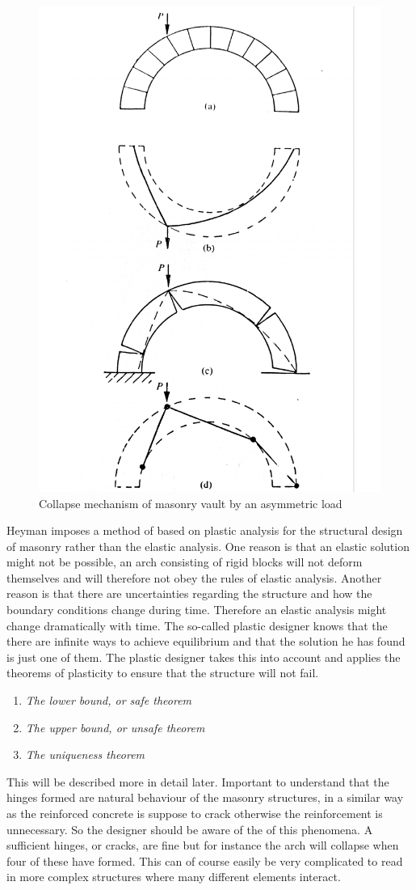 \begin{figure}[H] 
\centering
\includegraphics[width=0.5\linewidth ]{figure/Theory/heyman3.pdf}
\caption{Collapse mechanism of masonry vault by an asymmetric load}
\label{fig:arch2}
\end{figure}

Heyman imposes a method of based on plastic analysis for the structural design of masonry rather than the elastic analysis. One reason is that an elastic solution might not be possible, an arch consisting of rigid blocks will not deform themselves and will therefore not obey the rules of elastic analysis. Another reason is that there are uncertainties regarding the structure and how the boundary conditions change during time. Therefore an elastic analysis might change dramatically with time. The so-called plastic designer knows that the there are infinite ways to achieve equilibrium and that the solution he has found is just one of them. The plastic designer takes this into account and applies the theorems of plasticity to ensure that the structure will not fail. \\


\begin{enumerate}
\item \textit{The lower bound, or safe theorem}
\item \textit{The upper bound, or unsafe theorem}
\item \textit{The uniqueness theorem}
\end{enumerate}

This will be described more in detail later. Important to understand that the hinges formed are natural behaviour of the masonry structures, in a similar way as the reinforced concrete is suppose to crack otherwise the reinforcement is unnecessary. So the designer should be aware of the of this phenomena. A sufficient hinges, or cracks, are fine but for instance the arch will collapse when four of these have formed. This can of course easily be very complicated to read in more complex structures where many different elements interact.

